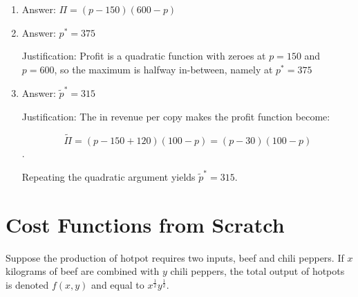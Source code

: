 \documentclass{article}
\newenvironment{solution}{\color{red}}{\color{black}}
\begin{document}
\begin{solution}

\begin{enumerate}
\item
Answer: $\Pi = (p-150)(600-p)$

\item
Answer: $p^{*} = 375$

Justification: Profit is a quadratic function with zeroes at $p = 150$ and $p = 600$, so the maximum is halfway in-between, namely at $p^{*} = 375$
 
\item
Answer: $\tilde{p}^{*} = 315$ 

Justification: The  in revenue per copy makes the profit function become:

\[ \tilde{\Pi} = (p-150+120)(100-p) = (p-30)(100-p) \].

Repeating the quadratic argument yields $\tilde{p}^{*} = 315$.
\end{enumerate}

\end{solution}


\section*{Cost Functions from Scratch}
Suppose the production of hotpot requires two inputs, beef and chili peppers. If $x$ kilograms of beef are combined with $y$ chili peppers, the total output of hotpots is denoted $f(x,y)$ and equal to $x^\frac12 y^\frac12$. 
\end{document}
